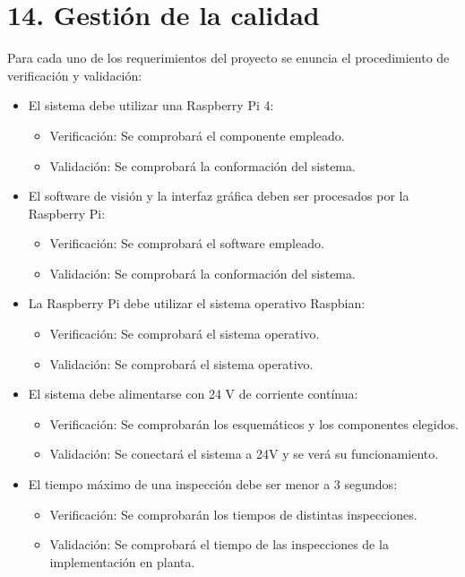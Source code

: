 \documentclass[
11pt, %
codirector, %
]{charter}
\begin{document}
\section{14. Gestión de la calidad}
\label{sec:calidad}

Para cada uno de los requerimientos del proyecto se enuncia el procedimiento de verificación y validación:

\setcounter{REQ}{0}
\begin{itemize} 

	\item \REQ El sistema debe utilizar una Raspberry Pi 4:
	\begin{itemize}
		\item Verificación: Se comprobará el componente empleado.
		\item Validación: Se comprobará la conformación del sistema.
	\end{itemize}
	
	\item \REQ El software de visión y la interfaz gráfica deben ser procesados por la Raspberry Pi:
	\begin{itemize}
		\item Verificación: Se comprobará el software empleado.
		\item Validación: Se comprobará la conformación del sistema.
	\end{itemize}
	
	\item \REQ La Raspberry Pi debe utilizar el sistema operativo Raspbian:
	\begin{itemize}
		\item Verificación: Se comprobará el sistema operativo.
		\item Validación: Se comprobará el sistema operativo.
	\end{itemize}

	\item \REQ El sistema debe alimentarse con 24 V de corriente contínua:
	\begin{itemize}
		\item Verificación: Se comprobarán los esquemáticos y los componentes elegidos.
		\item Validación: Se conectará el sistema a 24V y se verá su funcionamiento.
	\end{itemize}

	\item \REQ El tiempo máximo de una inspección debe ser menor a 3 segundos:
	\begin{itemize}
		\item Verificación: Se comprobarán los tiempos de distintas inspecciones.
		\item Validación: Se comprobará el tiempo de las inspecciones de la implementación en planta.
	\end{itemize}


\end{itemize}
\end{document}
